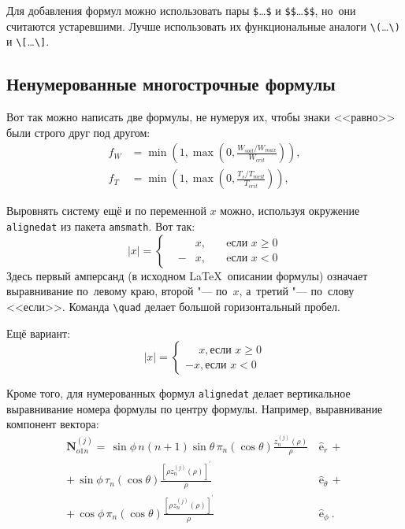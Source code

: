 Для добавления формул можно использовать пары \verb+$+\dots\verb+$+ и \verb+$$+\dots\verb+$$+,
но~они считаются устаревшими.
Лучше использовать их функциональные аналоги \verb+\(+\dots\verb+\)+ и \verb+\[+\dots\verb+\]+.

\subsection{Ненумерованные многострочные формулы}\label{subsec:ch1/sec3/sub2}

Вот так можно написать две формулы, не нумеруя их, чтобы знаки <<равно>> были
строго друг под другом:
\begin{align}
    f_W & =  \min \left( 1, \max \left( 0, \frac{W_{soil} / W_{max}}{W_{crit}} \right)  \right), \nonumber \\
    f_T & =  \min \left( 1, \max \left( 0, \frac{T_s / T_{melt}}{T_{crit}} \right)  \right), \nonumber
\end{align}

Выровнять систему ещё и по переменной \( x \) можно, используя окружение
\verb|alignedat| из пакета \verb|amsmath|. Вот так:
\[
|x| = \left\{
\begin{alignedat}{2}
     &   & x, \quad & \text{eсли } x\geqslant 0 \\
     & - & x, \quad & \text{eсли } x<0
\end{alignedat}
\right.
\]
Здесь первый амперсанд (в исходном \LaTeX\ описании формулы) означает
выравнивание по~левому краю, второй "--- по~\( x \), а~третий "--- по~слову
<<если>>. Команда \verb|\quad| делает большой горизонтальный пробел.

Ещё вариант:
\[
    |x|=
    \begin{cases}
        \phantom{-}x, \text{если } x \geqslant 0 \\
        -x, \text{если } x<0
    \end{cases}
\]

Кроме того, для  нумерованных формул \verb|alignedat| делает вертикальное
выравнивание номера формулы по центру формулы. Например, выравнивание
компонент вектора:
\begin{equation}
    \label{eq:2p3}
    \begin{alignedat}{2}
        {\mathbf{N}}_{o1n}^{(j)} = \,{\sin} \phi\,n\!\left(n+1\right)
        {\sin}\theta\,
        \pi_n\!\left({\cos} \theta\right)
        \frac{
        z_n^{(j)}\!\left( \rho \right)
        }{\rho}\,
         & {\boldsymbol{\hat{\mathrm e}}}_{r}\,+      \\
        +\,
        {\sin} \phi\,
        \tau_n\!\left({\cos} \theta\right)
        \frac{
        \left[\rho z_n^{(j)}\!\left( \rho \right)\right]^{\prime}
        }{\rho}\,
         & {\boldsymbol{\hat{\mathrm e}}}_{\theta}\,+ \\
        +\,
        {\cos} \phi\,
        \pi_n\!\left({\cos} \theta\right)
        \frac{
        \left[\rho z_n^{(j)}\!\left( \rho \right)\right]^{\prime}
        }{\rho}\,
         & {\boldsymbol{\hat{\mathrm e}}}_{\phi}\:.
    \end{alignedat}
\end{equation}

